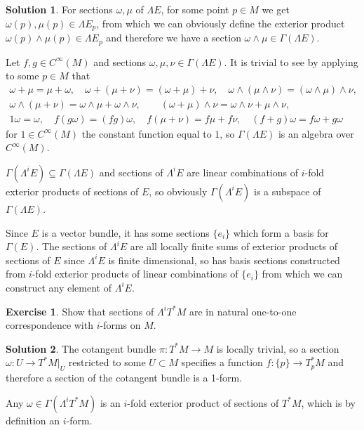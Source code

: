 \documentclass[11pt, a4paper]{report}
\theoremstyle{definition}
\newtheorem{exercise}{Exercise}[part]
\newtheorem{solution}{Solution}[part]
\newenvironment{ex}{\begin{exercise}}{\end{exercise}\pagebreak[1]}
\newenvironment{sol}{\begin{solution}}{\end{solution}\pagebreak[3]}
\begin{document}
\begin{sol}

For sections $\omega, \mu$ of $\Lambda E$, for some point $p \in M$ we get $\omega(p), \mu(p) \in \Lambda E_p$, from which we can obviously define the exterior product $\omega(p) \wedge \mu(p) \in \Lambda E_p$ and therefore we have a section $\omega \wedge \mu \in \Gamma(\Lambda E)$.

Let $f, g \in C^\infty(M)$ and sections $\omega, \mu, \nu \in \Gamma(\Lambda E)$.
It is trivial to see by applying to some $p \in M$ that
\begin{gather*}
    \omega + \mu = \mu + \omega, \quad
    \omega + (\mu + \nu) = (\omega + \mu) + \nu, \quad
    \omega \wedge (\mu \wedge \nu) = (\omega \wedge \mu) \wedge \nu, \\
    \omega \wedge (\mu + \nu) = \omega \wedge \mu + \omega \wedge \nu, \qquad
    (\omega + \mu) \wedge \nu = \omega \wedge \nu + \mu \wedge \nu, \\
    1 \omega = \omega, \quad
    f(g\omega) = (fg)\omega, \quad
    f(\mu + \nu) = f\mu + f\nu, \quad
    (f + g)\omega = f\omega + g\omega
\end{gather*}
for $1 \in C^\infty(M)$ the constant function equal to $1$,
so $\Gamma(\Lambda E)$ is an algebra over $C^\infty(M)$.

$\Gamma(\Lambda^i E) \subseteq \Gamma(\Lambda E)$ and sections of $\Lambda^i E$ are linear combinations of $i$-fold exterior products of sections of $E$, so obviously $\Gamma(\Lambda^i E)$ is a subspace of $\Gamma(\Lambda E)$.

Since $E$ is a vector bundle, it has some sections $\{e_i\}$ which form a basis for $\Gamma(E)$.
The sections of $\Lambda^i E$ are all locally finite sums of exterior products of sections of $E$ since $\Lambda^i E$ is finite dimensional, so has basis sections constructed from $i$-fold exterior products of linear combinations of $\{e_i\}$ from which we can construct any element of $\Lambda^i E$.

\end{sol}

\begin{ex}

Show that sections of $\Lambda^i T^* M$ are in natural one-to-one correspondence with $i$-forms on $M$.

\end{ex}

\begin{sol}

The cotangent bundle $\pi: T^* M \to M$ is locally trivial, so a section $\omega: U \to T^*M|_U$ restricted to some $U \subset M$ specifies a function $f: \{p\} \to T^*_p M$ and therefore a section of the cotangent bundle is a 1-form.

Any $\omega \in \Gamma(\Lambda^i T^* M)$ is an $i$-fold exterior product of sections of $T^* M$, which is by definition an $i$-form.

\end{sol}
\end{document}
